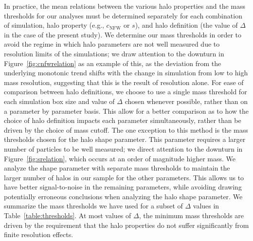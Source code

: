 \documentclass[usenatbib]{mnras}
\begin{document}
In practice, the mean relations between the various halo properties and the mass thresholds for our analyses 
must be determined separately for each combination of simulation, 
halo property (e.g., $c_{\mathrm{NFW}}$ or $s$), 
and halo definition (the value of $\Delta$ in the case of the present study). 
We determine our mass thresholds in order to avoid the regime in which halo parameters
are not well measured due to resolution limits of the simulations; we draw attention to the
downturn in Figure~\ref{fig:cnfwrelation} as an example of this, as the deviation from
the underlying monotonic trend shifts with the change in simulation from low to high mass resolution,
suggesting that this is the result of resolution alone. For ease of comparison
between halo definitions, we choose to use a single mass threshold for each
simulation box size and value of $\Delta$ chosen whenever possible, rather than on a parameter by
parameter basis. This allow for a better comparison as to how the choice of halo
definition impacts each parameter simultaneously, rather than be driven by the
choice of mass cutoff. The one exception to this method is the mass thresholds chosen
for the halo shape parameter. This parameter requires a larger number of particles to be
well measured; we direct attention to the downturn in Figure~\ref{fig:srelation}, which occurs at
an order of magnitude higher mass. We analyze the shape parameter with separate mass thresholds
to maintain the larger number of halos in our sample for the other parameters. This allows us
to have better signal-to-noise in the remaining parameters, while avoiding drawing potentially
erroneous conclusions when analyzing the halo shape parameter.
We summarize the mass thresholds we have used for a 
subset of $\Delta$ values in Table~\ref{table:thresholds}. 
At most values of $\Delta$, the minimum mass thresholds are 
driven by the requirement that the halo properties do 
not suffer significantly from finite resolution effects.


\end{document}
